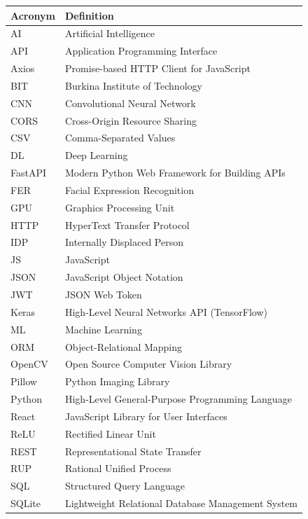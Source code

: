 \documentclass[a4paper,12pt,oneside]{report}
\begin{document}
\begin{longtable}{|p{3.5cm}|p{10.5cm}|}
\hline
\textbf{Acronym} & \textbf{Definition} \\
\hline
AI       & Artificial Intelligence \\
\hline
API      & Application Programming Interface \\
\hline
Axios    & Promise-based HTTP Client for JavaScript \\
\hline
BIT      & Burkina Institute of Technology \\
\hline
CNN      & Convolutional Neural Network \\
\hline
CORS     & Cross-Origin Resource Sharing \\
\hline
CSV      & Comma-Separated Values \\
\hline
DL       & Deep Learning \\
\hline
FastAPI  & Modern Python Web Framework for Building APIs \\
\hline
FER      & Facial Expression Recognition \\
\hline
GPU      & Graphics Processing Unit \\
\hline
HTTP     & HyperText Transfer Protocol \\
\hline
IDP      & Internally Displaced Person \\
\hline
JS       & JavaScript \\
\hline
JSON     & JavaScript Object Notation \\
\hline
JWT      & JSON Web Token \\
\hline
Keras    & High-Level Neural Networks API (TensorFlow) \\
\hline
ML       & Machine Learning \\
\hline
ORM      & Object-Relational Mapping \\
\hline
OpenCV   & Open Source Computer Vision Library \\
\hline
Pillow   & Python Imaging Library \\
\hline
Python   & High-Level General-Purpose Programming Language \\
\hline
React    & JavaScript Library for User Interfaces \\
\hline
ReLU     & Rectified Linear Unit \\
\hline
REST     & Representational State Transfer \\
\hline
RUP      & Rational Unified Process \\
\hline
SQL      & Structured Query Language \\
\hline
SQLite   & Lightweight Relational Database Management System \\

\end{longtable}
\end{document}
